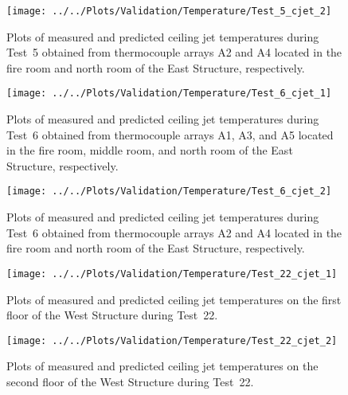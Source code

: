 \begin{figure}[!h]
	\centering
	\texttt{[image: ../../Plots/Validation/Temperature/Test\_5\_cjet\_2]}
	\caption[Plots of measured and predicted ceiling jet temperatures during Test~5.]{Plots of measured and predicted ceiling jet temperatures during Test~5 obtained from thermocouple arrays A2 and A4 located in the fire room and north room of the East Structure, respectively.}
	\label{fig:cjet2_data_Test5}
\end{figure}

\begin{figure}[!h]
	\centering
	\texttt{[image: ../../Plots/Validation/Temperature/Test\_6\_cjet\_1]}
	\caption[Plots of measured and predicted ceiling jet temperatures during Test~6.]{Plots of measured and predicted ceiling jet temperatures during Test~6 obtained from thermocouple arrays A1, A3, and A5 located in the fire room, middle room, and north room of the East Structure, respectively.}
	\label{fig:cjet1_data_Test6}
\end{figure}

\begin{figure}[!h]
	\centering
	\texttt{[image: ../../Plots/Validation/Temperature/Test\_6\_cjet\_2]}
	\caption[Plots of measured and predicted ceiling jet temperatures during Test~6.]{Plots of measured and predicted ceiling jet temperatures during Test~6 obtained from thermocouple arrays A2 and A4 located in the fire room and north room of the East Structure, respectively.}
	\label{fig:cjet2_data_Test6}
\end{figure}

\begin{figure}[!h]
	\centering
	\texttt{[image: ../../Plots/Validation/Temperature/Test\_22\_cjet\_1]}
	\caption[Plots of measured and predicted ceiling jet temperatures on the first floor during Test~22.]{Plots of measured and predicted ceiling jet temperatures on the first floor of the West Structure during Test~22.}
	\label{fig:cjet1_data_Test22}
\end{figure}

\begin{figure}[!h]
	\centering
	\texttt{[image: ../../Plots/Validation/Temperature/Test\_22\_cjet\_2]}
	\caption[Plots of measured and predicted ceiling jet temperatures on the second floor during Test~22.]{Plots of measured and predicted ceiling jet temperatures on the second floor of the West Structure during Test~22.}
	\label{fig:cjet2_data_Test22}
\end{figure}

